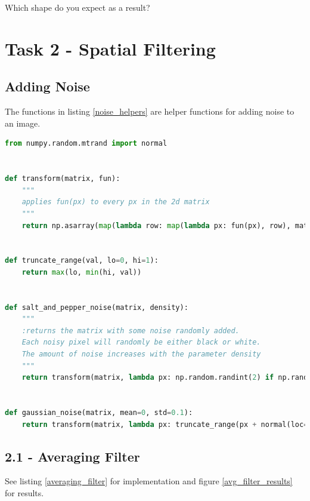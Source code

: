 Which shape do you expect as a result?

\newpage
\section*{Task 2 - Spatial Filtering}

\subsection*{Adding Noise}

The functions in listing \ref{noise_helpers} are helper functions for adding noise to an image.

\begin{lstlisting}[language=Python, label=noise_helpers, caption=Noise Helpers]
from numpy.random.mtrand import normal


def transform(matrix, fun):
    """
    applies fun(px) to every px in the 2d matrix
    """
    return np.asarray(map(lambda row: map(lambda px: fun(px), row), matrix))


def truncate_range(val, lo=0, hi=1):
    return max(lo, min(hi, val))


def salt_and_pepper_noise(matrix, density):
    """
    :returns the matrix with some noise randomly added.
    Each noisy pixel will randomly be either black or white.
    The amount of noise increases with the parameter density
    """
    return transform(matrix, lambda px: np.random.randint(2) if np.random.random() < density else px)


def gaussian_noise(matrix, mean=0, std=0.1):
    return transform(matrix, lambda px: truncate_range(px + normal(loc=mean, scale=std)))
\end{lstlisting}

\newpage
\subsection*{2.1 - Averaging Filter}

See listing \ref{averaging_filter} for implementation and figure \ref{avg_filter_results} for results.

